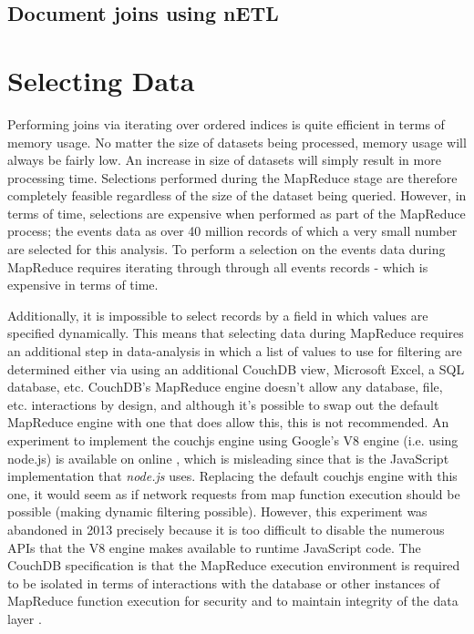 \subsection{Document joins using nETL}


\section{Selecting Data}
Performing joins via iterating over ordered indices is quite efficient in terms of memory usage. No matter the size of datasets being processed, memory usage will always be fairly low. An increase in size of datasets will simply result in more processing time. Selections performed during the MapReduce stage are therefore completely feasible regardless of the size of the dataset being queried. However, in terms of time, selections are expensive when performed as part of the MapReduce process; the events data as over 40 million records of which a very small number are selected for this analysis. To perform a selection on the events data during MapReduce requires iterating through through all events records - which is expensive in terms of time.

Additionally, it is impossible to select records by a field in which values are specified dynamically. This means that selecting data during MapReduce requires an additional step in data-analysis in which a list of values to use for filtering are determined either via using an additional CouchDB view, Microsoft Excel, a SQL database, etc. CouchDB's MapReduce engine doesn't allow any database, file, etc. interactions by design, and although it's possible to swap out the default MapReduce engine with one that does allow this, this is not recommended. An experiment to implement the couchjs engine using Google's V8 engine (i.e. using node.js) is available on online \cite{v8couchjs}, which is misleading since that is the JavaScript implementation that \textit{node.js} uses. Replacing the default couchjs engine with this one, it would seem as if network requests from map function execution should be possible (making dynamic filtering possible). However, this experiment was abandoned in 2013 precisely because it is too difficult to disable the numerous APIs that the V8 engine makes available to runtime JavaScript code. The CouchDB specification is that the MapReduce execution environment is required to be isolated in terms of interactions with the database or other instances of MapReduce function execution for security and to maintain integrity of the data layer \cite{slack28Feb}.

